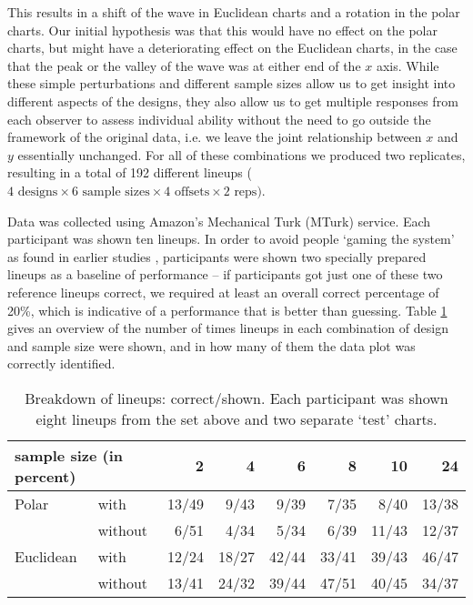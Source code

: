  This results in a shift of the wave in Euclidean charts and a rotation in the polar charts. Our initial hypothesis was that this would have no effect on the polar charts, but might have a deteriorating effect on the Euclidean charts, in the case that the peak or the valley of the wave was at either end of the $x$ axis. 
While these simple perturbations and different sample sizes allow us to get insight into different aspects of the designs, they also allow us to get multiple responses from each observer to assess individual ability without the need to go outside the framework of the original data, i.e. we leave the joint relationship between $x$ and $y$ essentially unchanged. For all of these combinations we produced two replicates, resulting in a total of 192 different lineups ($ 4 \text{ designs} \times 6 \text{ sample sizes} \times 4 \text{ offsets} \times 2 \text{ reps})$.

Data was collected using Amazon's Mechanical Turk (MTurk) service. Each participant was shown ten lineups. In order to avoid people `gaming the system' as found in earlier studies \cite{heer:2010, kosara:2010}, participants were shown two specially prepared lineups as a baseline of performance -- if participants got just one of these two reference lineups correct, we required at least an overall correct percentage of 20\%, which is indicative of a performance that is better than guessing. Table \ref{tbl:treatment} gives an overview of the number of times lineups in each combination of design and sample size were shown, and in how many of them the data plot was correctly identified. 

\begin{table}[hbtp]
\resizebox{\linewidth}{!} {
	\begin{tabular}{ll|@{}r|@{}r|@{}r|@{}r|@{}r|@{}r}
	\multicolumn{2}{l}{sample size (in percent)}  & 2 & 4 & 6 & 8 & 10 & 24 \\ [1pt] \hline
	Polar & with & 13/49& 9/43 & 9/39 & 7/35 & 8/40 & 13/38 \\
	& without & 6/51&   4/34 &  5/34 &  6/39 & 11/43 &  12/37\\ [1pt] \hline
	Euclidean & with &12/24& 18/27 & 42/44 & 33/41 & 39/43 & 46/47\\
	& without & 13/41 &24/32& 39/44 & 47/51 & 40/45 & 34/37\\
	\end{tabular}
	}
\caption{\label{tbl:treatment} Breakdown of lineups: correct/shown. Each participant was shown eight lineups from the set above and two separate `test' charts.}
\end{table}

